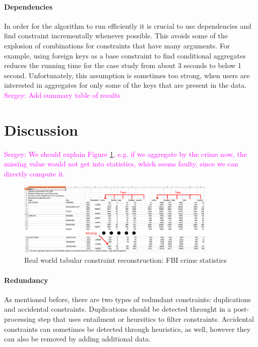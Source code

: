 \documentclass{ecai}
\newcommand{\sergey}[1]{\textcolor{magenta}{{\sc Sergey:} #1}\xspace}
\begin{document}
\paragraph{Dependencies}
In order for the algorithm to run efficiently it is crucial to use dependencies and find constraint incrementally whenever possible.
This avoids some of the explosion of combinations for constraints that have many arguments.
For example, using foreign keys as a base constraint to find conditional aggregates reduces the running time for the case study from about 3 seconds to below 1 second.
Unfortunately, this assumption is sometimes too strong, when users are interested in aggregates for only some of the keys that are present in the data.
\sergey{Add summary table of results}

\section{Discussion}
\sergey{We should explain Figure \ref{fig:fbi}, e.g. if we aggregate by the crime now, the missing value would not get into statistics, which seems faulty, since we can directly compute it.}

\begin{figure}[thb]
  \begin{center}
    \includegraphics[width=0.85\textwidth]{figures/fbi_figure_highlighted.png}
  \end{center}
  \caption{Real world tabular constraint reconstruction: FBI crime statistics}
  \label{fig:fbi}
\end{figure}

\paragraph{Redundancy}
As mentioned before, there are two types of redundant constraints: duplications and accidental constraints.
Duplications should be detected throught in a post-processing step that uses entailment or heursitics to filter constraints.
Accidental constraints can sometimes be detected through heuristics, as well, however they can also be removed by adding additional data.
\end{document}
